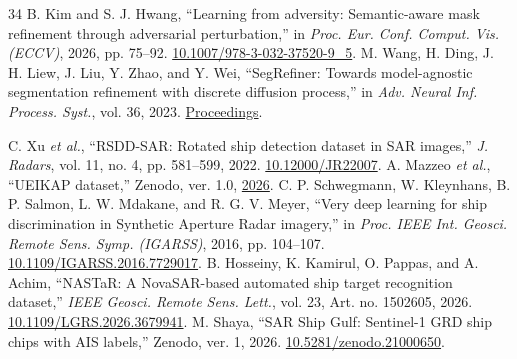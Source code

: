 \documentclass[journal]{IEEEtran}
\begin{document}
\begin{thebibliography}{34}
 B. Kim and S. J. Hwang, ``Learning from adversity: Semantic-aware mask refinement through adversarial perturbation,'' in \emph{Proc. Eur. Conf. Comput. Vis. (ECCV)}, 2026, pp. 75--92. \href{https://doi.org/10.1007/978-3-032-37520-9_5}{10.1007/978-3-032-37520-9\_5}.
 M. Wang, H. Ding, J. H. Liew, J. Liu, Y. Zhao, and Y. Wei, ``SegRefiner: Towards model-agnostic segmentation refinement with discrete diffusion process,'' in \emph{Adv. Neural Inf. Process. Syst.}, vol. 36, 2023. \href{https://proceedings.neurips.cc/paper_files/paper/2023/hash/fc0cc55dca3d791c4a0bb2d8ddeefe4f-Abstract-Conference.html}{Proceedings}.

 C. Xu \emph{et al.}, ``RSDD-SAR: Rotated ship detection dataset in SAR images,'' \emph{J. Radars}, vol. 11, no. 4, pp. 581--599, 2022. \href{https://doi.org/10.12000/JR22007}{10.12000/JR22007}.
 A. Mazzeo \emph{et al.}, ``UEIKAP dataset,'' Zenodo, ver. 1.0, \href{https://doi.org/10.5281/zenodo.18391027}{2026}.
 C. P. Schwegmann, W. Kleynhans, B. P. Salmon, L. W. Mdakane, and R. G. V. Meyer, ``Very deep learning for ship discrimination in Synthetic Aperture Radar imagery,'' in \emph{Proc. IEEE Int. Geosci. Remote Sens. Symp. (IGARSS)}, 2016, pp. 104--107. \href{https://doi.org/10.1109/IGARSS.2016.7729017}{10.1109/IGARSS.2016.7729017}.
 B. Hosseiny, K. Kamirul, O. Pappas, and A. Achim, ``NASTaR: A NovaSAR-based automated ship target recognition dataset,'' \emph{IEEE Geosci. Remote Sens. Lett.}, vol. 23, Art. no. 1502605, 2026. \href{https://doi.org/10.1109/LGRS.2026.3679941}{10.1109/LGRS.2026.3679941}.
 M. Shaya, ``SAR Ship Gulf: Sentinel-1 GRD ship chips with AIS labels,'' Zenodo, ver. 1, 2026. \href{https://doi.org/10.5281/zenodo.21000650}{10.5281/zenodo.21000650}.


\end{thebibliography}
\end{document}
